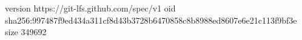 version https://git-lfs.github.com/spec/v1
oid sha256:997487f9ed434a311cf8d43b3728b6470858c8b8988ed8607e6e21c113f9bf3e
size 349692
